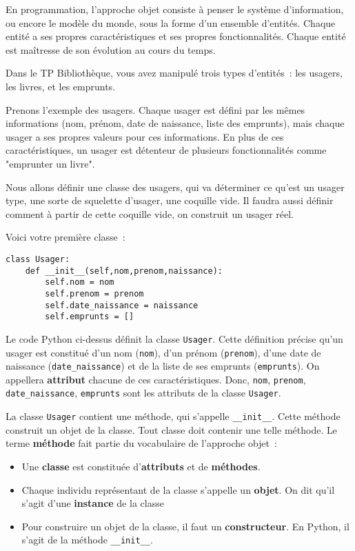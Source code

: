 \documentclass{article}
\begin{document}
En programmation, l'approche objet consiste à penser le système d'information, ou encore le modèle du monde, sous la forme d'un ensemble d'entités. Chaque entité a ses propres caractéristiques et ses propres fonctionnalités. Chaque entité est maîtresse de son évolution au cours du temps.

Dans le TP Bibliothèque, vous avez manipulé trois types d'entités~: les usagers, les livres, et les emprunts.

Prenons l'exemple des usagers. Chaque usager est défini par les mêmes informations (nom, prénom, date de naissance, liste des emprunts), mais chaque usager a ses propres valeurs pour ces informations. En  plus de ces caractéristiques, un usager est détenteur de plusieurs fonctionnalités comme "emprunter un livre".

Nous allons définir une classe des usagers, qui va déterminer ce qu'est un usager type, une sorte de squelette d'usager, une coquille vide. Il faudra aussi définir comment à partir de cette coquille vide, on construit un usager réel.

Voici votre première classe~:

\begin{verbatim}
class Usager:
    def __init__(self,nom,prenom,naissance):
        self.nom = nom
        self.prenom = prenom
        self.date_naissance = naissance
        self.emprunts = []

\end{verbatim}  

Le code Python ci-dessus définit la classe \texttt{Usager}. Cette définition précise qu'un usager est constitué d'un nom (\texttt{nom}), d'un prénom (\texttt{prenom}), d'une date de naissance (\texttt{date\_naissance}) et de la liste de ses emprunts (\texttt{emprunts}). On appellera \textbf{attribut} chacune de ces caractéristiques. Donc, \texttt{nom}, \texttt{prenom}, \texttt{date\_naissance}, \texttt{emprunts} sont les attributs de la classe \texttt{Usager}.

La classe \texttt{Usager} contient une méthode, qui s'appelle \texttt{\_\_init\_\_}. Cette méthode construit un objet de la classe. Tout classe doit contenir une telle méthode. Le terme \textbf{méthode} fait partie du vocabulaire de l'approche objet~:

\begin{itemize}
\item Une \textbf{classe} est constituée d'\textbf{attributs} et de \textbf{méthodes}.
\item Chaque individu représentant de la  classe s'appelle un \textbf{objet}. On dit qu'il s'agit d'une \textbf{instance} de la classe
\item Pour construire un objet de la classe, il faut un \textbf{constructeur}. En Python, il s'agit de la méthode  \texttt{\_\_init\_\_}. 
\end{itemize}
\end{document}
